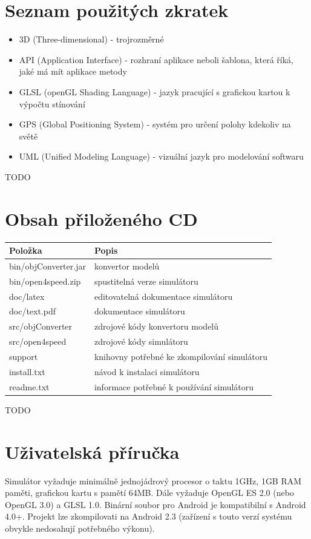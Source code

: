 \documentclass[11pt,twoside,a4paper]{book}
\begin{document}
\chapter{Seznam použitých zkratek}
\begin{itemize}
\item 3D (Three-dimensional) - trojrozměrné
\item API (Application Interface) - rozhraní aplikace neboli šablona, která říká, jaké má mít aplikace metody
\item GLSL (openGL Shading Language) - jazyk pracující s grafickou kartou k výpočtu stínování
\item GPS (Global Positioning System) - systém pro určení polohy kdekoliv na světě
\item UML (Unified Modeling Language) - vizuální jazyk pro modelování softwaru
\end{itemize}
TODO

\chapter{Obsah přiloženého CD}

\begin{center}
\begin{tabular}{|p{50mm}|p{100mm}|}
\hline
\textbf{Položka} & 
\textbf{Popis} \\
\hline
\hline
bin/objConverter.jar & konvertor modelů\\
\hline
bin/open4speed.zip & spustitelná verze simulátoru\\
\hline
doc/latex & editovatelná dokumentace simulátoru\\
\hline
doc/text.pdf & dokumentace simulátoru\\
\hline
src/objConverter & zdrojové kódy konvertoru modelů\\
\hline
src/open4speed & zdrojové kódy simulátoru\\
\hline
support & knihovny potřebné ke zkompilování simulátoru\\
\hline
install.txt & návod k instalaci simulátoru\\
\hline
readme.txt & informace potřebné k používání simulátoru\\
\hline
\end{tabular}
\end{center}
TODO

\chapter{Uživatelská příručka}
Simulátor vyžaduje minimálně jednojádrový procesor o taktu 1GHz, 1GB RAM paměti, grafickou kartu s pamětí 64MB. Dále vyžaduje OpenGL ES 2.0 (nebo OpenGL 3.0) a GLSL 1.0. Binární soubor pro Android je kompatibilní s Android 4.0+. Projekt lze zkompilovat\linebreak i na Android 2.3 (zařízení s touto verzí systému obvykle nedosahují potřebného výkonu).
\end{document}
